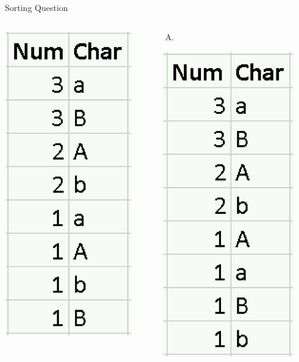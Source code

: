 \documentclass[xcolor=svgnames]{beamer}
\begin{document}
\begin{frame}{Sorting Question}
\begin{columns}[T]
\begin{column}{.33\textwidth}
    \includegraphics[height=.6\textheight]{sortB}
  \end{column}%
\begin{column}{.33\textwidth}
\vspace{-1em}
\begin{enumerate}[C)]
\item 
\end{enumerate}
      \includegraphics[height=.6\textheight]{sortC}
\end{column}%
\hfill%
\end{columns}
\end{frame}
\end{document}
